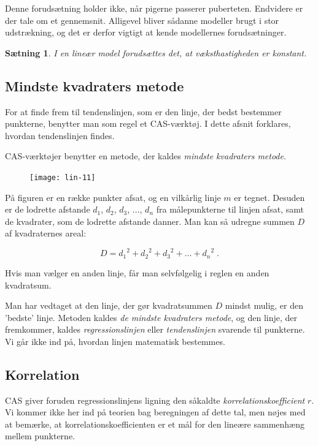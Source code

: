 \documentclass[12pt,oneside,a4paper]{article}
\newtheorem{thm}{Sætning}[section]
\begin{document}
Denne forudsætning holder ikke, når pigerne passerer puberteten.  Endvidere er
der tale om et gennemsnit.  Alligevel bliver sådanne modeller brugt i stor
udstrækning, og det er derfor vigtigt at kende modellernes forudsætninger. 
\begin{thm}
    I en lineær model forudsættes det, at væksthastigheden er konstant.
\end{thm}

\subsection{Mindste kvadraters metode}

For at finde frem til tendenslinjen, som er den linje, der bedst bestemmer
punkterne, benytter man som regel et CAS-værktøj. I dette afsnit forklares,
hvordan tendenslinjen findes.

CAS-værktøjer benytter en metode, der kaldes {\em mindste kvadraters metode}.

\begin{figure}[H]
    \centering
    \texttt{[image: lin-11]}
    \caption{}
\end{figure}

På figuren er en række punkter afsat, og en vilkårlig linje $m$ er tegnet.
Desuden er de lodrette afstande $d_1$, $d_2$, $d_3$, ..., $d_n$ fra
målepunkterne til linjen afsat, samt de kvadrater, som de lodrette afstande
danner. Man kan så udregne summen $D$ af kvadraternes areal:

\[
D = {d_1}^2 + {d_2}^2 + {d_3}^2 + \ldots + {d_n}^2 \; . 
\]

Hvis man vælger en anden linje, får man selvfølgelig i reglen en anden
kvadratsum.

Man har vedtaget at den linje, der gør kvadratsummen $D$ mindst mulig, er den
'bedste' linje. Metoden kaldes {\em de mindste kvadraters metode}, og den
linje, der fremkommer, kaldes {\em regressionslinjen} eller {\em tendenslinjen}
svarende til punkterne. Vi går ikke ind på, hvordan linjen matematisk
bestemmes. 

\subsection{Korrelation}
CAS giver foruden regressionslinjens ligning den såkaldte {\em
korrelations\-koef\-fi\-cient} $r$. Vi kommer ikke her ind på teorien bag
beregningen af dette tal, men nøjes med at bemærke, at
korrelationskoefficienten er et mål for den lineære sammenhæng mellem
punkterne.
\end{document}
